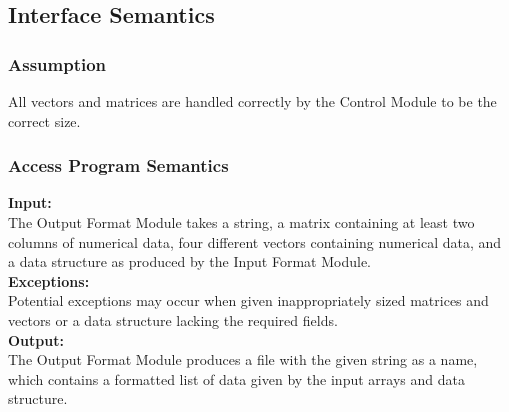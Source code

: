 \documentclass[12pt]{article}
\begin{document}
\subsection{Interface Semantics}


\subsubsection{Assumption}
All vectors and matrices are handled correctly by the Control Module to be the correct size.


\subsubsection{Access Program Semantics}
\noindent \textbf{Input:}\\
The Output Format Module takes a string, a matrix containing at least two columns of numerical
data, four different vectors containing numerical data, and a data structure 
as produced by the Input Format Module.\\

\noindent \textbf{Exceptions:}\\
Potential exceptions may occur when given inappropriately sized
matrices and vectors or a data structure lacking the required fields.\\

\noindent \textbf{Output:}\\
The Output Format Module produces a file with the given string as a name, which contains a formatted list of data given by the input arrays and data structure.

\end{document}
